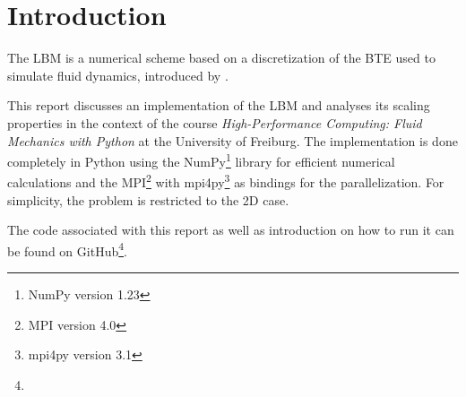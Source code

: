 \section{Introduction}

The \gls{LBM} is a numerical scheme based on a discretization of the \gls{BTE} used to simulate fluid dynamics, introduced by \citeauthor{McNamara1988LBM} \cite{McNamara1988LBM}.

This report discusses an implementation of the \gls{LBM} and analyses its scaling properties in the context of the course \textit{High-Performance Computing: Fluid Mechanics with Python} at the University of Freiburg. The implementation is done completely in Python using the NumPy\footnote{NumPy version 1.23} \cite{NumPy} library for efficient numerical calculations and the \gls{MPI}\footnote{MPI version 4.0} \cite{MPI40} with mpi4py\footnote{mpi4py version 3.1} \cite{mpi4py} as bindings for the parallelization. For simplicity, the problem is restricted to the 2D case.

The code associated with this report as well as introduction on how to run it can be found on GitHub\footnote{\therepository}.
